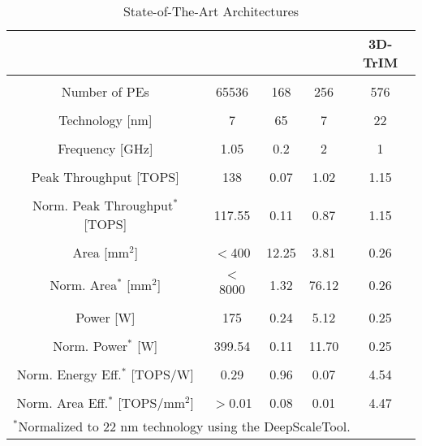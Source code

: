 \begin{table}[t]
  \centering
   \setlength{\tabcolsep}{5pt} %
   \renewcommand{\arraystretch}{0.7} %
  \caption{State-of-The-Art Architectures}
  \begin{tabular}{c c c c c}
  \toprule
    \ & \cite{Jouppi_21} & \cite{Chen_17} & \cite{Feng_24} & 3D-TrIM \\
    \midrule
     \\ Number of PEs & 65536 & 168 & 256 & 576 \\
     \\ Technology [nm] & 7 & 65 & 7 & 22 \\
     \\ Frequency [GHz] & 1.05 & 0.2 & 2 & 1 \\
     \\ Peak Throughput [TOPS] & 138 & 0.07 & 1.02 & 1.15 \\
     \\ Norm. Peak Throughput$^{\mathrm{*}}$ [TOPS] & 117.55 & 0.11 & 0.87 & 1.15 \\
     \\ Area [mm$^2$] & $<$400 & 12.25 & 3.81 & 0.26 \\
     \\ Norm. Area$^{\mathrm{*}}$ [mm$^2$] & $<$8000 & 1.32 & 76.12 & 0.26 \\
     \\ Power [W] & 175 & 0.24 & 5.12 & 0.25 \\
     \\ Norm. Power$^{\mathrm{*}}$ [W] & 399.54 & 0.11 & 11.70 & 0.25 \\
     \\ Norm. Energy Eff.$^{\mathrm{*}}$ [TOPS/W] & 0.29 & 0.96 & 0.07 & 4.54 \\
     \\ Norm. Area Eff.$^{\mathrm{*}}$ [TOPS/mm$^2$] & $>$0.01 & 0.08 & 0.01 & 4.47 \\
\bottomrule 
    \multicolumn{5}{l}{$^{\mathrm{*}}$Normalized to 22 nm technology using the DeepScaleTool\cite{Sarangi_1,Sarangi_2}.} \\
  \end{tabular}
  \label{SOTA}
\end{table}